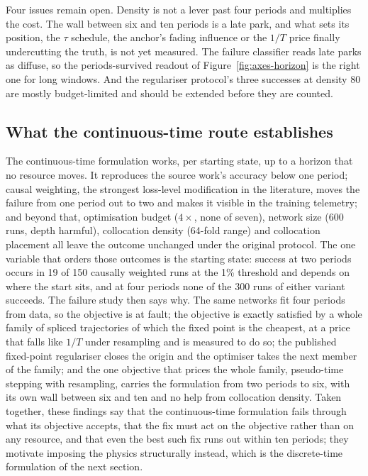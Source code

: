 \documentclass[11pt,a4paper]{article}
\begin{document}
Four issues remain open. Density is not a lever past four periods and
multiplies the cost. The wall between six and ten periods is a late
park, and what sets its position, the $\tau$ schedule, the anchor's
fading influence or the $1/T$ price finally undercutting the truth, is
not yet measured. The failure classifier reads late parks as diffuse,
so the periods-survived readout of Figure~\ref{fig:axes-horizon} is the
right one for long windows. And the regulariser protocol's three
successes at density 80 are mostly budget-limited and should be
extended before they are counted.

\subsection{What the continuous-time route establishes}
\label{sec:cont-summary}

The continuous-time formulation works, per starting state, up to a horizon that no resource moves. It reproduces the source work's accuracy below one period; causal weighting, the strongest loss-level modification in the literature, moves the failure from one period out to two and makes it visible in the training telemetry; and beyond that, optimisation budget ($4\times$, none of seven), network size (600 runs, depth harmful), collocation density (64-fold range) and collocation placement all leave the outcome unchanged under the original protocol. The one variable that orders those outcomes is the starting state: success at two periods occurs in 19 of 150 causally weighted runs at the 1\% threshold and depends on where the start sits, and at four periods none of the 300 runs of either variant succeeds. The failure study then says why. The same networks fit four periods from data, so the objective is at fault; the objective is exactly satisfied by a whole family of spliced trajectories of which the fixed point is the cheapest, at a price that falls like $1/T$ under resampling and is measured to do so; the published fixed-point regulariser closes the origin and the optimiser takes the next member of the family; and the one objective that prices the whole family, pseudo-time stepping with resampling, carries the formulation from two periods to six, with its own wall between six and ten and no help from collocation density. Taken together, these findings say that the continuous-time formulation fails through what its objective accepts, that the fix must act on the objective rather than on any resource, and that even the best such fix runs out within ten periods; they motivate imposing the physics structurally instead, which is the discrete-time formulation of the next section.
\end{document}
